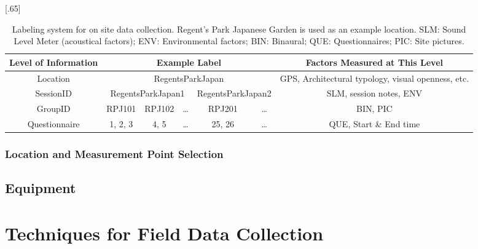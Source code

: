      \begin{table}
       \caption{Labeling system for on site data collection. Regent's Park Japanese Garden is used as an example location. SLM: Sound Level Meter (acoustical factors); ENV: Environmental factors; BIN: Binaural; QUE: Questionnaires; PIC: Site pictures.}
       \label{table:metadata}
       \centering
       \scalebox{.65}[.65]{\begin{tabular}{cccccccc}
           \toprule
           \textbf{Level of Information} & \multicolumn{6}{c}{\textbf{Example Label}} & \textbf{Factors Measured at This Level}                                                                                 \\
           \midrule
           Location                      & \multicolumn{6}{c}{RegentsParkJapan}       & GPS, Architectural typology, visual openness, etc.                                                                      \\ \midrule
           SessionID                     & \multicolumn{4}{c}{RegentsParkJapan1}      & \multicolumn{2}{c}{RegentsParkJapan2}              & SLM, session notes, ENV                                            \\ \midrule
           GroupID                       & \multicolumn{2}{c}{RPJ101}                 & RPJ102                                             & \ldots                  & RPJ201 & \ldots & BIN, PIC               \\ \midrule
           Questionnaire                 & \multicolumn{2}{c}{1, 2, 3}                & 4, 5                                               & \ldots                  & 25, 26 & \ldots & QUE, Start \& End time \\ \bottomrule
         \end{tabular}}

     \end{table}

   \subsubsection{Location and Measurement Point Selection}

 \subsection{Equipment}

\section{Techniques for Field Data Collection}


